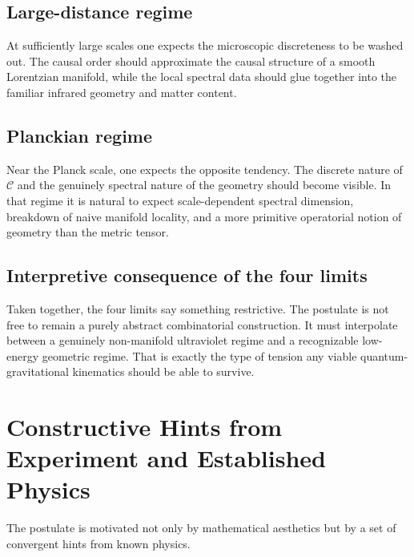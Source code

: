 \documentclass[12pt,a4paper]{article}
\theoremstyle{postulate}
\newcommand{\Causal}{\mathcal{C}}
\begin{document}
\subsection{Large-distance regime}

At sufficiently large scales one expects the microscopic discreteness to be
washed out.  The causal order should approximate the causal structure of a
smooth Lorentzian manifold, while the local spectral data should glue
together into the familiar infrared geometry and matter content.

\subsection{Planckian regime}

Near the Planck scale, one expects the opposite tendency.  The discrete
nature of $\Causal$ and the genuinely spectral nature of the geometry should
become visible.  In that regime it is natural to expect scale-dependent
spectral dimension, breakdown of naive manifold locality, and a more
primitive operatorial notion of geometry than the metric tensor.

\subsection{Interpretive consequence of the four limits}

Taken together, the four limits say something restrictive.  The postulate is
not free to remain a purely abstract combinatorial construction.  It must
interpolate between a genuinely non-manifold ultraviolet regime and a
recognizable low-energy geometric regime.  That is exactly the type of
tension any viable quantum-gravitational kinematics should be able to
survive.

\section{Constructive Hints from Experiment and Established Physics}
\label{sec:hints}

The postulate is motivated not only by mathematical aesthetics but by a set
of convergent hints from known physics.
\end{document}
